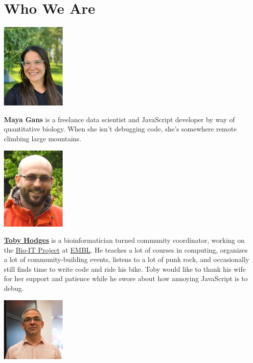 \section{Who We Are}\label{s:intro-contributors}

\begin{center}
  \includegraphics{figures/gans-maya.png}
\end{center}

\noindent
\textbf{Maya Gans} is a freelance data scientist and JavaScript developer by way
of quantitative biology.  When she isn't debugging code, she's somewhere remote
climbing large mountains.

\begin{center}
  \includegraphics{figures/hodges-toby.png}
\end{center}

\noindent
\textbf{\href{https://tbyhdgs.info/}{Toby Hodges}} is a bioinformatician turned community
coordinator, working on the \href{https://bio-it.embl.de}{Bio-IT Project} at
\href{https://www.embl.de}{EMBL}. He teaches a lot of courses in computing, organizes
a lot of community-building events, listens to a lot of punk rock, and
occasionally still finds time to write code and ride his bike. Toby would like
to thank his wife for her support and patience while he swore about how annoying
JavaScript is to debug.

\begin{center}
  \includegraphics{figures/wilson-greg.png}
\end{center}

